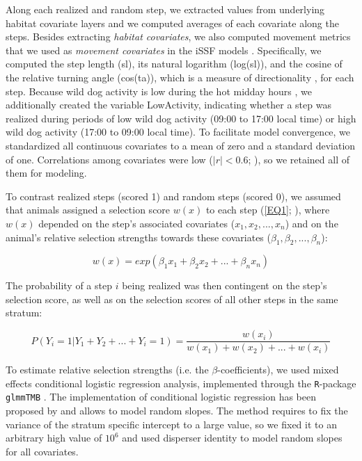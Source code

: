 \documentclass[../FinalThesis.tex]{subfiles}
\begin{document}
Along each realized and random step, we extracted values from underlying habitat
covariate layers and we computed averages of each covariate along the steps.
Besides extracting \textit{habitat covariates}, we also computed movement
metrics that we used as \textit{movement covariates} in the iSSF models
\citep{Avgar.2016, Fieberg.2021}. Specifically, we computed the step length
(\textsf{sl}), its natural logarithm (\textsf{log(sl)}), and the cosine of the
relative turning angle (\textsf{cos(ta)}), which is a measure of directionality
\citep{Turchin.1998}, for each step. Because wild dog activity is low during the
hot midday hours \citep{Cozzi.2012}, we additionally created the variable
\textsf{LowActivity}, indicating whether a step was realized during periods of
low wild dog activity (09:00 to 17:00 local time) or high wild dog activity
(17:00 to 09:00 local time). To facilitate model convergence, we standardized
all continuous covariates to a mean of zero and a standard deviation of one.
Correlations among covariates were low (\(|r| < 0.6\); \citealp{Latham.2011}),
so we retained all of them for modeling.

To contrast realized steps (scored 1) and random steps (scored 0), we assumed
that animals assigned a selection score \(w(x)\) to each step (\ref{EQ1};
\citealp{Fortin.2005}), where \(w(x)\) depended on the step's associated
covariates (\(x_1, x_2, ..., x_n\)) and on the animal's relative selection
strengths \citep{Avgar.2017} towards these covariates (\(\beta_1, \beta_2,
..., \beta_n\)):

\begin{equation}
\label{EQ1}
  w(x) = exp(\beta_1 x_1 + \beta_2 x_2 + ... + \beta_n x_n)
\end{equation}

\noindent The probability of a step \(i\) being realized was then contingent on
the step's selection score, as well as on the selection scores of all other
steps in the same stratum:

\begin{equation}
\label{EQ2}
  P(Y_{i} = 1 | Y_{1} + Y_{2} + ... + Y_{i} = 1) =
  \frac{w(x_{i})}{w(x_{1}) + w(x_{2}) + ... + w(x_{i})}
\end{equation}

\noindent To estimate relative selection strengths (i.e. the
\(\beta\)-coefficients), we used mixed effects conditional logistic regression
analysis, implemented through the \texttt{R}-package \texttt{glmmTMB}
\citep{Brooks.2017}. The implementation of conditional logistic regression has
been proposed by \citet{Muff.2020} and allows to model random slopes. The method
requires to fix the variance of the stratum specific intercept to a large value,
so we fixed it to an arbitrary high value of \(10 ^ 6\) and used disperser
identity to model random slopes for all covariates.
\end{document}
